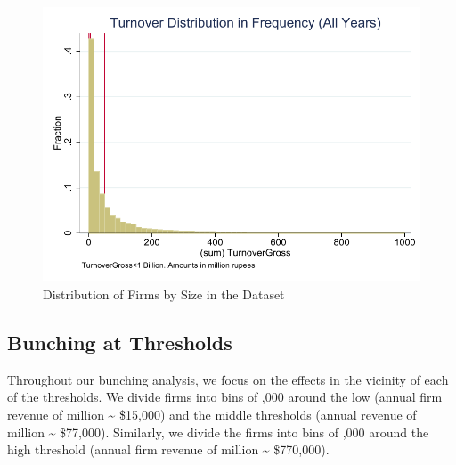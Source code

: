 \begin{figure}[t]
  \label{fig:Distribution_of_Firms}
  \caption{Distribution of Firms by Size in the Dataset}
  \includegraphics[width=1\textwidth]{graphs/TurnoverDistribution_Fraction_WeaklyPositive} 
\end{figure}

\subsection{Bunching at Thresholds}
\label{subsec:3-methodology-bunching}
Throughout our bunching analysis, we focus on the effects in the vicinity of each of the thresholds. We divide firms into bins of ,000 around the low (annual firm revenue of  million \textasciitilde{} \$15,000) and the middle thresholds (annual revenue of  million \textasciitilde{} \$77,000). Similarly, we divide the firms into bins of ,000 around the high threshold (annual firm revenue of  million \textasciitilde{} \$770,000). 


